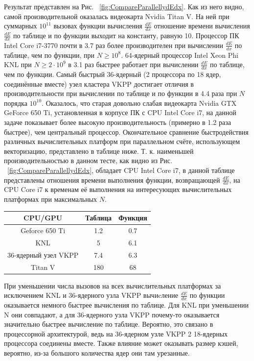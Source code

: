 \documentclass[a4paper,12pt]{article}
\begin{document}
\begin{large}
	 Результат представлен на Рис. ~\ref{fig:CompareParallellydEdx}.
	 Как из него видно, самой производительной оказалась видеокарта Nvidia Titan V.
	 На ней при суммарных $10^{11}$ вызовах функции вычисления $\frac{dE}{dx}$ отношение времени вычисления $\frac{dE}{dx}$ по таблице и по функции выходит на константу, равную 10.
	 Процессор ПК Intel Core i7-3770 почти в 3.7 раз более производителен при вычислении $\frac{dE}{dx}$ по таблице, чем по функции, при $N \geq 10^8$.
	 64-ядерный процессор Intel Xeon Phi KNL при $N \geq 2\cdot 10^9$ в 3.1 раз быстрее работает при вычислении $\frac{dE}{dx}$ по таблице, чем по функции.
	 Самый быстрый 36-ядерный (2 процессора по 18 ядер, соединённые вместе) узел кластера VKPP достигает отличия в производительности при вычислении по таблице и по функции в 4.4 раза при $N$ порядка $10^{10}$.
	 Оказалось, что старая довольно слабая видеокарта Nvidia GTX GeForce 650 Ti, установленная в корпусе ПК с CPU Intel Core i7, на данной задаче показывает более высокую производительность (примерно в 1.2 раза быстрее), чем центральный процессор.
	 Окончательное сравнение быстродействия различных вычислительных платформ при параллельном счёте, использующем векторизацию, представлено в таблице ниже.
	 Т. к. наименьшей производительностью в данном тесте, как видно из Рис. ~\ref{fig:CompareParallellydEdx}, обладает CPU Intel Core i7, в данной таблице представлены отношения времени выполнения функции, возвращающей $\frac{dE}{dx}$, на CPU Core i7 к временам её выполнения на интересующих вычислительных платформах при максимальных $N$.
	 
	 \begin{tabular}{|c|c|c|}
	 \hline 
	 CPU/GPU & Таблица & Функция \\ 
	 \hline 
	 Geforce 650 Ti & 1.2 & 0.7 \\ 
	 \hline 
	 KNL & 5 & 6.1 \\ 
	 \hline 
	 36-ядерный узел VKPP & 7.4 & 6.3 \\ 
	 \hline 
	 Titan V & 180 & 68 \\ 
	 \hline 
	 \end{tabular} 
	 
	При уменьшении числа вызовов на всех вычислительных платформах за исключением KNL и 36-ядерного узла VKPP вычиcление $\frac{dE}{dx}$ по функции оказывается немного быстрее вычисления по таблице.
	Для KNL при уменьшении N они совпадают, а для 36-ядерного узла VKPP почему-то оказывается значительно быстрее вычисление по таблице.
	Вероятно, это связано в процессорной архитектурой, ведь на 36-ядерном узле VKPP 2 18-ядерных процессора соединены вместе.
	Также влияние может оказывать размер кэшей, вероятно, из-за большого количества ядер они там урезанные.
	

\end{large}
\end{document}
